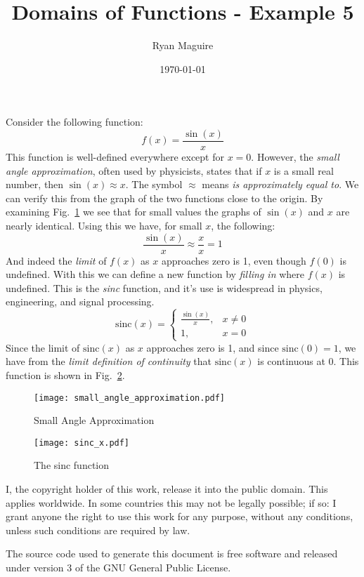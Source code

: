\documentclass{article}
\title{Domains of Functions - Example 5}
\author{Ryan Maguire}
\date{\today}
\begin{document}
    \maketitle
    Consider the following function:
    \begin{equation}
        f(x)=\frac{\sin(x)}{x}
    \end{equation}
    This function is well-defined everywhere except for $x=0$. However, the
    \textit{small angle approximation}, often used by physicists, states that
    if $x$ is a small real number, then $\sin(x)\approx{x}$. The symbol
    $\approx$ means \textit{is approximately equal to}. We can verify this
    from the graph of the two functions close to the origin. By examining
    Fig.~\ref{fig:small_angle_approx} we see that for small values the graphs
    of $\sin(x)$ and $x$ are nearly identical. Using this we have, for
    small $x$, the following:
    \begin{equation}
        \frac{\sin(x)}{x}\approx\frac{x}{x}=1
    \end{equation}
    And indeed the \textit{limit} of $f(x)$ as $x$ approaches zero is 1, even
    though $f(0)$ is undefined. With this we can define a new function by
    \textit{filling in} where $f(x)$ is undefined. This is the
    \textit{sinc} function, and it's use is widespread in physics, engineering,
    and signal processing.
    \begin{equation}
        \textrm{sinc}(x)=
        \begin{cases}
            \frac{\sin(x)}{x},&x\ne{0}\\
            1,&x=0
        \end{cases}
    \end{equation}
    Since the limit of $\textrm{sinc}(x)$ as $x$ approaches zero is 1, and
    since $\textrm{sinc}(0)=1$, we have from the
    \textit{limit definition of continuity} that $\textrm{sinc}(x)$ is
    continuous at 0. This function is shown in
    Fig.~\ref{fig:sinc_x}.
    \begin{figure}
        \centering
        \texttt{[image: small\_angle\_approximation.pdf]}
        \caption{Small Angle Approximation}
        \label{fig:small_angle_approx}
    \end{figure}
    \begin{figure}
        \centering
        \texttt{[image: sinc\_x.pdf]}
        \caption{The sinc function}
        \label{fig:sinc_x}
    \end{figure}
    \newpage
    I, the copyright holder of this work, release it into the public domain.
    This applies worldwide. In some countries this may not be legally possible;
    if so: I grant anyone the right to use this work for any purpose, without
    any conditions, unless such conditions are required by law.
    \par\hfill\par
    The source code used to generate this document is free software and released
    under version 3 of the GNU General Public License.
\end{document}

